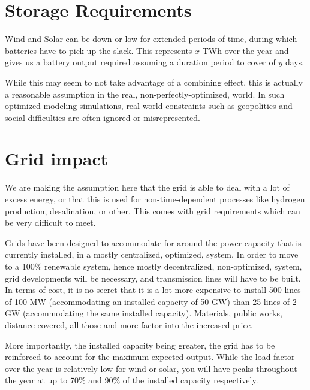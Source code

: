 \section{Storage Requirements}



\begin{kaobox}[frametitle=What we have said]
Wind and Solar can be down or low for extended periods of time, during which batteries have to pick up the slack. This represents $x$ TWh over the year and gives us a battery output required assuming a duration period to cover of $y$ days.

While this may seem to not take advantage of a combining effect, this is actually a reasonable assumption in the real, non-perfectly-optimized, world. In such optimized modeling simulations, real world constraints such as geopolitics and social difficulties are often ignored or misrepresented.

\end{kaobox}







\section{Grid impact}

We are making the assumption here that the grid is able to deal with a lot of excess energy, or that this is used for non-time-dependent processes like hydrogen production, desalination, or other. This comes with grid requirements which can be very difficult to meet.

Grids have been designed to accommodate for around the power capacity that is currently installed, in a mostly centralized, optimized, system. In order to move to a 100\% renewable system, hence mostly decentralized, non-optimized, system, grid developments will be necessary, and transmission lines will have to be built. In terms of cost, it is no secret that it is a lot more expensive to install 500 lines of 100 MW (accommodating an installed capacity of 50 GW) than 25 lines of 2 GW (accommodating the same installed capacity). Materials, public works, distance covered, all those and more factor into the increased price.

More importantly, the installed capacity being greater, the grid has to be reinforced to account for the maximum expected output. While the load factor over the year is relatively low for wind or solar, you will have peaks throughout the year at up to 70\% and 90\% of the installed capacity respectively. 

